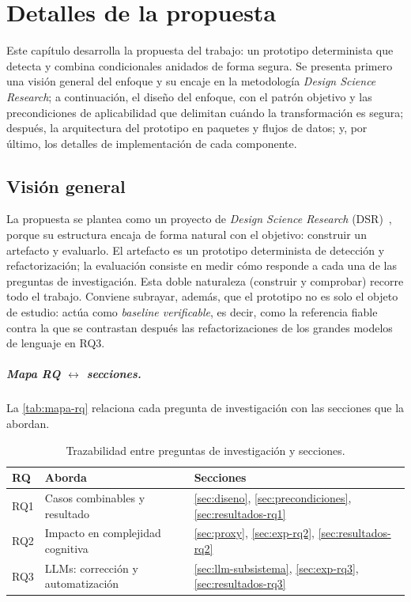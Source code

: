 
\chapter{Detalles de la propuesta}
\label{cap:propuesta}

Este capítulo desarrolla la propuesta del trabajo: un prototipo determinista que
detecta y combina condicionales anidados de forma segura. Se presenta primero
una visión general del enfoque y su encaje en la metodología \emph{Design
Science Research}; a continuación, el diseño del enfoque, con el patrón objetivo
y las precondiciones de aplicabilidad que delimitan cuándo la transformación es
segura; después, la arquitectura del prototipo en paquetes y flujos de datos; y,
por último, los detalles de implementación de cada componente.

\section{Visión general}
\label{sec:vision-general}
La propuesta se plantea como un proyecto de \emph{Design Science Research}
(DSR)~\cite{10.2307/25148625, 10.2753/MIS0742-1222240302}, porque su
estructura encaja de forma natural con el
objetivo: construir un artefacto y evaluarlo. El artefacto es un prototipo
determinista de detección y refactorización; la evaluación consiste en
medir cómo responde a cada una de las preguntas de investigación. Esta
doble naturaleza (construir y comprobar) recorre todo el trabajo. Conviene
subrayar, además, que el prototipo no es solo el objeto de estudio: actúa
como \emph{baseline verificable}, es decir, como la referencia fiable
contra la que se contrastan después las refactorizaciones de los grandes
modelos de lenguaje en RQ3.

\paragraph{Mapa RQ $\leftrightarrow$ secciones.}
La \autoref{tab:mapa-rq} relaciona cada pregunta de investigación con las
secciones que la abordan.

\begin{table}[ht]
\centering
\caption{Trazabilidad entre preguntas de investigación y secciones.}
\label{tab:mapa-rq}
\begin{tabular}{@{}lll@{}}
\toprule
\textbf{RQ} & \textbf{Aborda} & \textbf{Secciones} \\
\midrule
RQ1 & Casos combinables y resultado & \ref{sec:diseno}, \ref{sec:precondiciones}, \ref{sec:resultados-rq1} \\
RQ2 & Impacto en complejidad cognitiva & \ref{sec:proxy}, \ref{sec:exp-rq2}, \ref{sec:resultados-rq2} \\
RQ3 & LLMs: corrección y automatización & \ref{sec:llm-subsistema}, \ref{sec:exp-rq3}, \ref{sec:resultados-rq3} \\
\bottomrule
\end{tabular}
\end{table}


